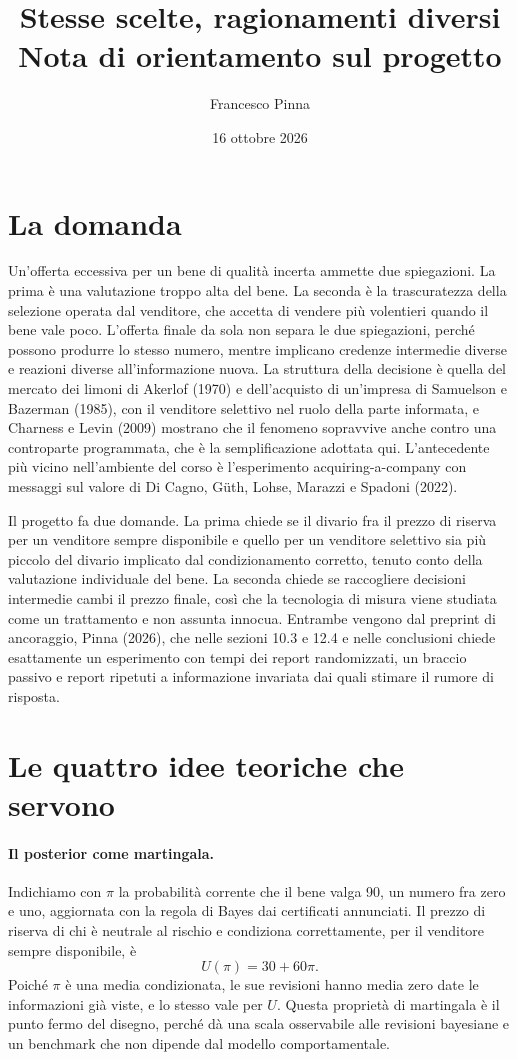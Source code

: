 \documentclass[11pt,a4paper]{article}
\title{Stesse scelte, ragionamenti diversi\\[2pt] \large Nota di orientamento sul progetto}
\author{Francesco Pinna}
\date{16 ottobre 2026}
\begin{document}
\maketitle

\section{La domanda}

Un'offerta eccessiva per un bene di qualit\`a incerta ammette due spiegazioni. La prima \`e una valutazione troppo alta del bene. La seconda \`e la trascuratezza della selezione operata dal venditore, che accetta di vendere pi\`u volentieri quando il bene vale poco. L'offerta finale da sola non separa le due spiegazioni, perch\'e possono produrre lo stesso numero, mentre implicano credenze intermedie diverse e reazioni diverse all'informazione nuova. La struttura della decisione \`e quella del mercato dei limoni di Akerlof (1970) e dell'acquisto di un'impresa di Samuelson e Bazerman (1985), con il venditore selettivo nel ruolo della parte informata, e Charness e Levin (2009) mostrano che il fenomeno sopravvive anche contro una controparte programmata, che \`e la semplificazione adottata qui. L'antecedente pi\`u vicino nell'ambiente del corso \`e l'esperimento acquiring-a-company con messaggi sul valore di Di Cagno, G\"uth, Lohse, Marazzi e Spadoni (2022).

Il progetto fa due domande. La prima chiede se il divario fra il prezzo di riserva per un venditore sempre disponibile e quello per un venditore selettivo sia pi\`u piccolo del divario implicato dal condizionamento corretto, tenuto conto della valutazione individuale del bene. La seconda chiede se raccogliere decisioni intermedie cambi il prezzo finale, cos\`i che la tecnologia di misura viene studiata come un trattamento e non assunta innocua. Entrambe vengono dal preprint di ancoraggio, Pinna (2026), che nelle sezioni 10.3 e 12.4 e nelle conclusioni chiede esattamente un esperimento con tempi dei report randomizzati, un braccio passivo e report ripetuti a informazione invariata dai quali stimare il rumore di risposta.

\section{Le quattro idee teoriche che servono}

\paragraph{Il posterior come martingala.}
Indichiamo con $\pi$ la probabilit\`a corrente che il bene valga 90, un numero fra zero e uno, aggiornata con la regola di Bayes dai certificati annunciati. Il prezzo di riserva di chi \`e neutrale al rischio e condiziona correttamente, per il venditore sempre disponibile, \`e
\[
U(\pi)=30+60\pi.
\]
Poich\'e $\pi$ \`e una media condizionata, le sue revisioni hanno media zero date le informazioni gi\`a viste, e lo stesso vale per $U$. Questa propriet\`a di martingala \`e il punto fermo del disegno, perch\'e d\`a una scala osservabile alle revisioni bayesiane e un benchmark che non dipende dal modello comportamentale.
\end{document}
